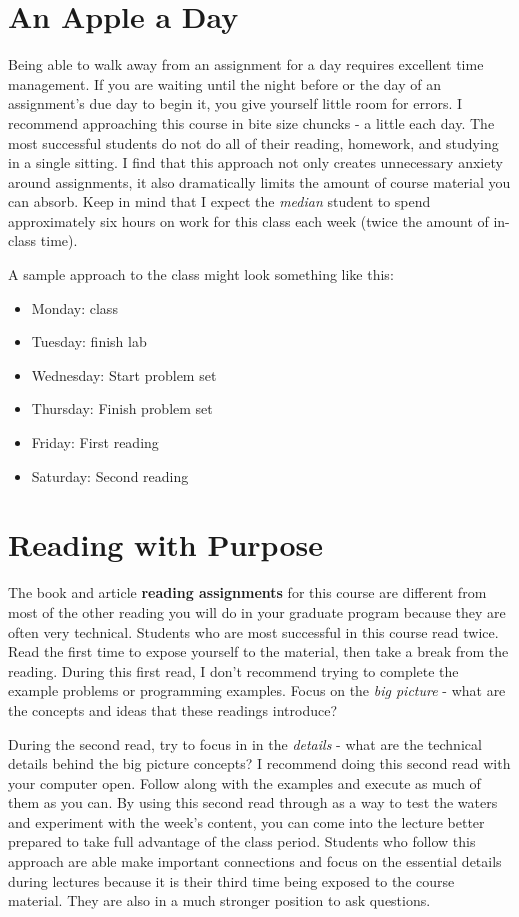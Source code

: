 \documentclass[]{book}
\providecommand{\tightlist}{%
  \setlength{\itemsep}{0pt}\setlength{\parskip}{0pt}}
\begin{document}
\section{An Apple a Day}\label{an-apple-a-day}

Being able to walk away from an assignment for a day requires excellent
time management. If you are waiting until the night before or the day of
an assignment's due day to begin it, you give yourself little room for
errors. I recommend approaching this course in bite size chuncks - a
little each day. The most successful students do not do all of their
reading, homework, and studying in a single sitting. I find that this
approach not only creates unnecessary anxiety around assignments, it
also dramatically limits the amount of course material you can absorb.
Keep in mind that I expect the \emph{median} student to spend
approximately six hours on work for this class each week (twice the
amount of in-class time).

A sample approach to the class might look something like this:

\begin{itemize}
\tightlist
\item
  Monday: class
\item
  Tuesday: finish lab
\item
  Wednesday: Start problem set
\item
  Thursday: Finish problem set
\item
  Friday: First reading
\item
  Saturday: Second reading
\end{itemize}

\section{Reading with Purpose}\label{reading-with-purpose}

The book and article \textbf{reading assignments} for this course are
different from most of the other reading you will do in your graduate
program because they are often very technical. Students who are most
successful in this course read twice. Read the first time to expose
yourself to the material, then take a break from the reading. During
this first read, I don't recommend trying to complete the example
problems or programming examples. Focus on the \emph{big picture} - what
are the concepts and ideas that these readings introduce?

During the second read, try to focus in in the \emph{details} - what are
the technical details behind the big picture concepts? I recommend doing
this second read with your computer open. Follow along with the examples
and execute as much of them as you can. By using this second read
through as a way to test the waters and experiment with the week's
content, you can come into the lecture better prepared to take full
advantage of the class period. Students who follow this approach are
able make important connections and focus on the essential details
during lectures because it is their third time being exposed to the
course material. They are also in a much stronger position to ask
questions.
\end{document}
